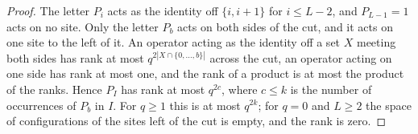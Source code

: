 \begin{proof}
    \leanok
    The letter $P_i$ acts as the identity off $\{i,i+1\}$ for $i\le L-2$, and
    $P_{L-1}=1$ acts on no site. Only the letter $P_b$ acts on both sides of the
    cut, and it acts on one site to the left of it. An operator acting as the
    identity off a set $X$ meeting both sides has rank at most $q^{2|X\cap\{0,\ldots,b\}|}$ across
    the cut, an operator acting on one side has rank at most one, and the rank of
    a product is at most the product of the ranks. Hence $P_I$ has rank at most
    $q^{2c}$, where $c\le k$ is the number of occurrences of $P_b$ in $I$. For
    $q\ge1$ this is at most $q^{2k}$; for $q=0$ and $L\ge2$ the space of
    configurations of the sites left of the cut is empty, and the rank is zero.
\end{proof}
